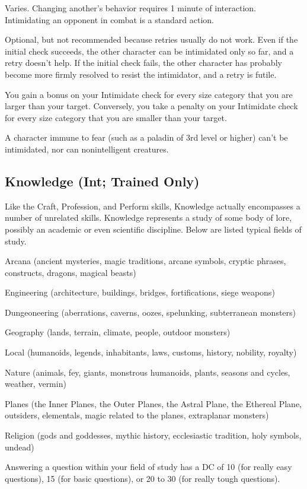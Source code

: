  Varies. Changing another's behavior requires 1 minute of interaction. Intimidating an opponent in combat is a standard action.

 Optional, but not recommended because retries usually do not work. Even if the initial check succeeds, the other character can be intimidated only so far, and a retry doesn't help. If the initial check fails, the other character has probably become more firmly resolved to resist the intimidator, and a retry is futile.

 You gain a  bonus on your Intimidate check for every size category that you are larger than your target. Conversely, you take a  penalty on your Intimidate check for every size category that you are smaller than your target.

\par A character immune to fear (such as a paladin of 3rd level or higher) can't be intimidated, nor can nonintelligent creatures.

\subsection{Knowledge (Int; Trained Only)}
Like the Craft, Profession, and Perform skills, Knowledge actually encompasses a number of unrelated skills. Knowledge represents a study of some body of lore, possibly an academic or even scientific discipline. Below are listed typical fields of study.
\begin{itemize*}
\item Arcana (ancient mysteries, magic traditions, arcane symbols,
cryptic phrases, constructs, dragons, magical beasts)
\item Engineering (architecture, buildings, bridges, fortifications, siege weapons)
\item Dungeoneering (aberrations, caverns, oozes, spelunking, subterranean monsters)
\item Geography (lands, terrain, climate, people, outdoor monsters)
\item Local (humanoids, legends, inhabitants, laws, customs, history, nobility, royalty)
\item Nature (animals, fey, giants, monstrous humanoids, plants, seasons and cycles, weather, vermin)
\item Planes (the Inner Planes, the Outer Planes, the Astral Plane,
the Ethereal Plane, outsiders, elementals, magic related to the planes, extraplanar monsters)
\item Religion (gods and goddesses, mythic history, ecclesiastic tradition, holy symbols, undead)
\end{itemize*}
 Answering a question within your field of study has a DC of 10 (for really easy questions), 15 (for basic questions), or 20 to 30 (for really tough questions).

